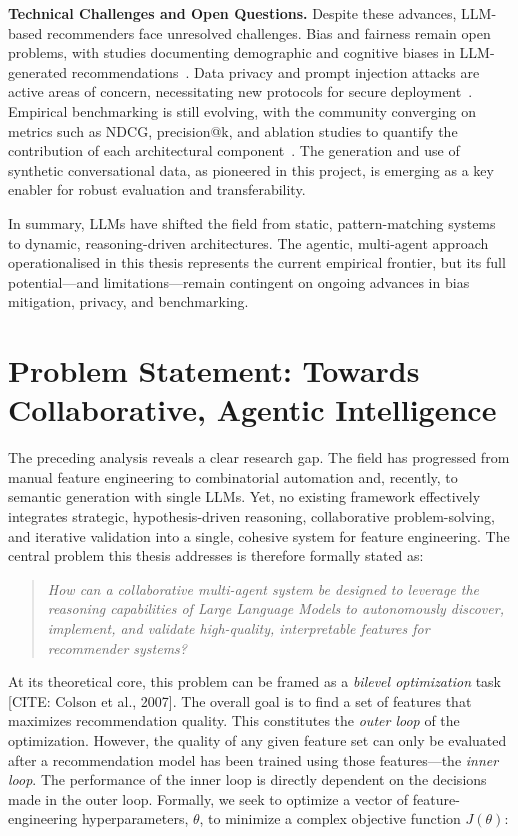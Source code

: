 \textbf{Technical Challenges and Open Questions.} Despite these advances, LLM-based recommenders face unresolved challenges. Bias and fairness remain open problems, with studies documenting demographic and cognitive biases in LLM-generated recommendations~\cite{Deldjoo2024Biases, Lyu2024CognitiveBias}. Data privacy and prompt injection attacks are active areas of concern, necessitating new protocols for secure deployment~\cite{Yi2024PromptInjection}. Empirical benchmarking is still evolving, with the community converging on metrics such as NDCG, precision@k, and ablation studies to quantify the contribution of each architectural component~\cite{Wang2023LLMAgentsSurvey, Lin2024Survey}. The generation and use of synthetic conversational data, as pioneered in this project, is emerging as a key enabler for robust evaluation and transferability.

In summary, LLMs have shifted the field from static, pattern-matching systems to dynamic, reasoning-driven architectures. The agentic, multi-agent approach operationalised in this thesis represents the current empirical frontier, but its full potential—and limitations—remain contingent on ongoing advances in bias mitigation, privacy, and benchmarking.
\section{Problem Statement: Towards Collaborative, Agentic Intelligence}
\label{sec:intro_problem}

The preceding analysis reveals a clear research gap. The field has progressed from manual feature engineering to combinatorial automation and, recently, to semantic generation with single LLMs. Yet, no existing framework effectively integrates strategic, hypothesis-driven reasoning, collaborative problem-solving, and iterative validation into a single, cohesive system for feature engineering. The central problem this thesis addresses is therefore formally stated as:

\blockquote{\itshape
How can a collaborative multi-agent system be designed to leverage the reasoning capabilities of Large Language Models to autonomously discover, implement, and validate high-quality, interpretable features for recommender systems?}

At its theoretical core, this problem can be framed as a \textit{bilevel optimization} task [CITE: Colson et al., 2007]. The overall goal is to find a set of features that maximizes recommendation quality. This constitutes the \textit{outer loop} of the optimization. However, the quality of any given feature set can only be evaluated after a recommendation model has been trained using those features—the \textit{inner loop}. The performance of the inner loop is directly dependent on the decisions made in the outer loop. Formally, we seek to optimize a vector of feature-engineering hyperparameters, $\theta$, to minimize a complex objective function $J(\theta)$:

